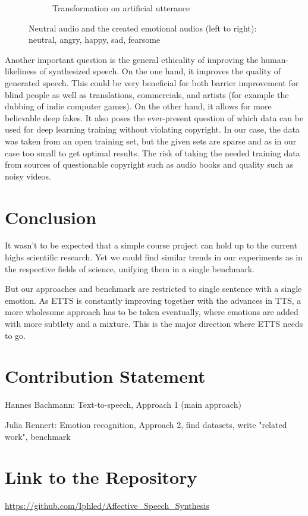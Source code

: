 \documentclass[11pt]{article}
\begin{document}
\begin{figure}
\begin{subfigure}{.5\textwidth}
\begin{subfigure}{.18\textwidth}
  \label{fig:sfig2}
\end{subfigure}
\caption{Transformation on artificial utterance}
\end{subfigure}
\caption{Neutral audio and the created emotional audios (left to right): neutral, angry, happy, sad, fearsome}
\label{fig:fig}
\end{figure}
Another important question is the general ethicality of improving the human-likeliness of synthesized speech. On the one hand, it improves the quality of generated speech. This could be very beneficial for both barrier improvement for blind people as well as translations, commercials, and artists (for example the dubbing of indie computer games). On the other hand, it allows for more believable deep fakes. It also poses the ever-present question of which data can be used for deep learning training without violating copyright. In our case, the data was taken from an open training set, but the given sets are sparse and as in our case too small to get optimal results\cite{he_improve_2022}. The risk of taking the needed training data from sources of questionable copyright such as audio books and quality such as noisy videos.

\section{Conclusion}
\label{conclusion}
It wasn't to be expected that a simple course project can hold up to the current highs scientific research. Yet we could find similar trends in our experiments as in the respective fields of science, unifying them in a single benchmark.

But our approaches and benchmark are restricted to single sentence with a single emotion.
As ETTS is constantly improving together with the advances in TTS, a more wholesome approach has to be taken eventually, where emotions are added with more subtlety and a mixture. This is the major direction where ETTS needs to go.

\section{Contribution Statement}
Hannes Bachmann: Text-to-speech, Approach 1 (main approach)

Julia Rennert: Emotion recognition, Approach 2, find datasets, write "related work", benchmark

\section{Link to the Repository}
{\small\url{https://github.com/Iphled/Affective\_Speech\_Synthesis}}
\end{document}
